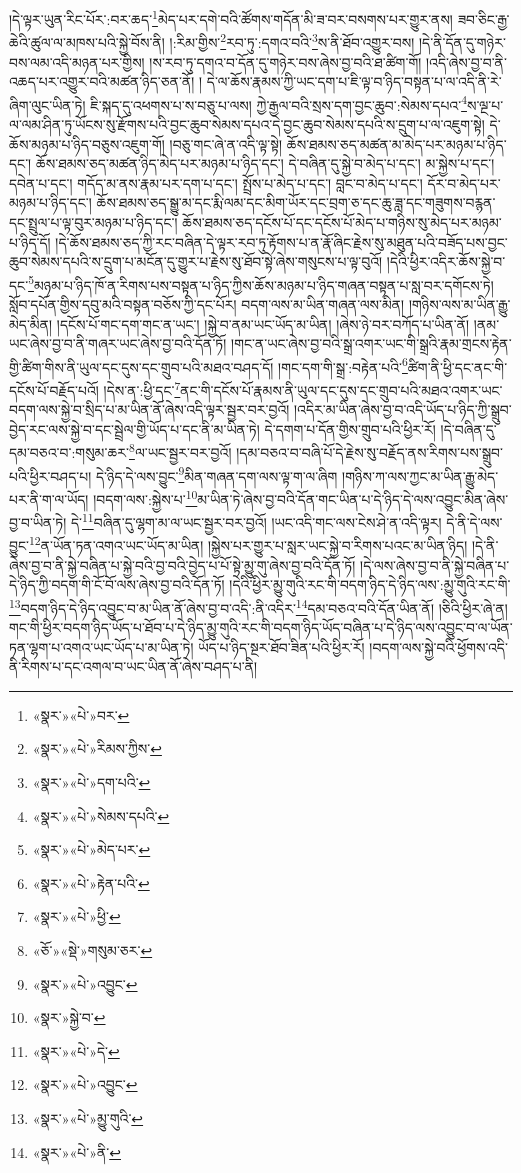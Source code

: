 །དེ་ལྟར་ཡུན་རིང་པོར་:བར་ཆད་\footnote{«སྣར་»«པེ་»བར་}མེད་པར་དགེ་བའི་ཚོགས་གདོན་མི་ཟ་བར་བསགས་པར་གྱུར་ནས། ཟབ་ཅིང་རྒྱ་ཆེའི་ཚུལ་ལ་མཁས་པའི་སྐྱེ་བོས་ནི། །:རིམ་གྱིས་\footnote{«སྣར་»«པེ་»རིམས་ཀྱིས་}རབ་ཏུ་:དགའ་བའི་\footnote{«སྣར་»«པེ་»དག་པའི་}ས་ནི་ཐོབ་འགྱུར་བས། །དེ་ནི་དོན་དུ་གཉེར་བས་ལམ་འདི་མཉན་པར་གྱིས། །ས་རབ་ཏུ་དགའ་བ་དོན་དུ་གཉེར་བས་ཞེས་བྱ་བའི་ཐ་ཚིག་གོ། །འདི་ཞེས་བྱ་བ་ནི་འཆད་པར་འགྱུར་བའི་མཚན་ཉིད་ཅན་ནོ། །
དེ་ལ་ཆོས་རྣམས་ཀྱི་ཡང་དག་པ་ཇི་ལྟ་བ་ཉིད་བསྟན་པ་ལ་འདི་ནི་རེ་ཞིག་ལུང་ཡིན་ཏེ། ཇི་སྐད་དུ་འཕགས་པ་ས་བཅུ་པ་ལས། ཀྱེ་རྒྱལ་བའི་སྲས་དག་བྱང་ཆུབ་:སེམས་དཔའ་\footnote{«སྣར་»«པེ་»སེམས་དཔའི་}ས་ལྔ་པ་ལ་ལམ་ཤིན་ཏུ་ཡོངས་སུ་རྫོགས་པའི་བྱང་ཆུབ་སེམས་དཔའ་དེ་བྱང་ཆུབ་སེམས་དཔའི་ས་དྲུག་པ་ལ་འཇུག་སྟེ། དེ་ཆོས་མཉམ་པ་ཉིད་བཅུས་འཇུག་གོ། །བཅུ་གང་ཞེ་ན་འདི་ལྟ་སྟེ། ཆོས་ཐམས་ཅད་མཚན་མ་མེད་པར་མཉམ་པ་ཉིད་དང་། ཆོས་ཐམས་ཅད་མཚན་ཉིད་མེད་པར་མཉམ་པ་ཉིད་དང་། དེ་བཞིན་དུ་སྐྱེ་བ་མེད་པ་དང་། མ་སྐྱེས་པ་དང་། དབེན་པ་དང་། གདོད་མ་ནས་རྣམ་པར་དག་པ་དང་། སྤྲོས་པ་མེད་པ་དང་། བླང་བ་མེད་པ་དང་། དོར་བ་མེད་པར་མཉམ་པ་ཉིད་དང་། ཆོས་ཐམས་ཅད་སྒྱུ་མ་དང་རྨི་ལམ་དང་མིག་ཡོར་དང་བྲག་ཅ་དང་ཆུ་ཟླ་དང་གཟུགས་བརྙན་དང་སྤྲུལ་པ་ལྟ་བུར་མཉམ་པ་ཉིད་དང་། ཆོས་ཐམས་ཅད་དངོས་པོ་དང་དངོས་པོ་མེད་པ་གཉིས་སུ་མེད་པར་མཉམ་པ་ཉིད་དོ། །དེ་ཆོས་ཐམས་ཅད་ཀྱི་རང་བཞིན་དེ་ལྟར་རབ་ཏུ་རྟོགས་པ་ན་རྣོ་ཞིང་རྗེས་སུ་མཐུན་པའི་བཟོད་པས་བྱང་ཆུབ་སེམས་དཔའི་ས་དྲུག་པ་མངོན་དུ་གྱུར་པ་རྗེས་སུ་ཐོབ་སྟེ་ཞེས་གསུངས་པ་ལྟ་བུའོ། །དེའི་ཕྱིར་འདིར་ཆོས་སྐྱེ་བ་དང་\footnote{«སྣར་»«པེ་»མེད་པར་}མཉམ་པ་ཉིད་ཁོ་ན་རིགས་པས་བསྟན་པ་ཉིད་ཀྱིས་ཆོས་མཉམ་པ་ཉིད་གཞན་བསྟན་པ་སླ་བར་དགོངས་ཏེ། སློབ་དཔོན་གྱིས་དབུ་མའི་བསྟན་བཅོས་ཀྱི་དང་པོར། བདག་ལས་མ་ཡིན་གཞན་ལས་མིན། །གཉིས་ལས་མ་ཡིན་རྒྱུ་མེད་མིན། །དངོས་པོ་གང་དག་གང་ན་ཡང་། །སྐྱེ་བ་ནམ་ཡང་ཡོད་མ་ཡིན། །ཞེས་ཉེ་བར་བཀོད་པ་ཡིན་ནོ། །ནམ་ཡང་ཞེས་བྱ་བ་ནི་གཞར་ཡང་ཞེས་བྱ་བའི་དོན་ཏོ། །གང་ན་ཡང་ཞེས་བྱ་བའི་སྒྲ་འགར་ཡང་གི་སྒྲའི་རྣམ་གྲངས་རྟེན་གྱི་ཚིག་གིས་ནི་ཡུལ་དང་དུས་དང་གྲུབ་པའི་མཐའ་བཤད་དོ། །གང་དག་གི་སྒྲ་:བརྟེན་པའི་\footnote{«སྣར་»«པེ་»རྟེན་པའི་}ཚིག་ནི་ཕྱི་དང་ནང་གི་དངོས་པོ་བརྗོད་པའོ། །དེས་ན་:ཕྱི་དང་\footnote{«སྣར་»«པེ་»ཕྱི་}ནང་གི་དངོས་པོ་རྣམས་ནི་ཡུལ་དང་དུས་དང་གྲུབ་པའི་མཐའ་འགར་ཡང་བདག་ལས་སྐྱེ་བ་སྲིད་པ་མ་ཡིན་ནོ་ཞེས་འདི་ལྟར་སྦྱར་བར་བྱའོ། །འདིར་མ་ཡིན་ཞེས་བྱ་བ་འདི་ཡོད་པ་ཉིད་ཀྱི་སྒྲུབ་བྱེད་རང་ལས་སྐྱེ་བ་དང་སྦྲེལ་གྱི་ཡོད་པ་དང་ནི་མ་ཡིན་ཏེ། དེ་དགག་པ་དོན་གྱིས་གྲུབ་པའི་ཕྱིར་རོ། །དེ་བཞིན་དུ་དམ་བཅའ་བ་:གསུམ་ཆར་\footnote{«ཅོ་»«སྡེ་»གསུམ་ཅར་}ལ་ཡང་སྦྱར་བར་བྱའོ། །དམ་བཅའ་བ་བཞི་པོ་དེ་རྗེས་སུ་བརྗོད་ནས་རིགས་པས་སྒྲུབ་པའི་ཕྱིར་བཤད་པ། དེ་ཉིད་དེ་ལས་བྱུང་\footnote{«སྣར་»«པེ་»འབྱུང་}མིན་གཞན་དག་ལས་ལྟ་ག་ལ་ཞིག །གཉིས་ཀ་ལས་ཀྱང་མ་ཡིན་རྒྱུ་མེད་པར་ནི་ག་ལ་ཡོད། །བདག་ལས་:སྐྱེས་པ་\footnote{«སྣར་»སྐྱེ་བ་}མ་ཡིན་ཏེ་ཞེས་བྱ་བའི་དོན་གང་ཡིན་པ་དེ་ཉིད་དེ་ལས་འབྱུང་མིན་ཞེས་བྱ་བ་ཡིན་ཏེ། དེ་\footnote{«སྣར་»«པེ་»དེ་}བཞིན་དུ་ལྷག་མ་ལ་ཡང་སྦྱར་བར་བྱའོ། །ཡང་འདི་གང་ལས་ངེས་ཤེ་ན་འདི་ལྟར། དེ་ནི་དེ་ལས་བྱུང་\footnote{«སྣར་»«པེ་»འབྱུང་}ན་ཡོན་ཏན་འགའ་ཡང་ཡོད་མ་ཡིན། །སྐྱེས་པར་གྱུར་པ་སླར་ཡང་སྐྱེ་བ་རིགས་པའང་མ་ཡིན་ཉིད། །དེ་ནི་ཞེས་བྱ་བ་ནི་སྐྱེ་བཞིན་པ་སྐྱེ་བའི་བྱ་བའི་བྱེད་པ་པོ་སྟེ་མྱུ་གུ་ཞེས་བྱ་བའི་དོན་ཏོ། །དེ་ལས་ཞེས་བྱ་བ་ནི་སྐྱེ་བཞིན་པ་དེ་ཉིད་ཀྱི་བདག་གི་ངོ་བོ་ལས་ཞེས་བྱ་བའི་དོན་ཏོ། །དེའི་ཕྱིར་མྱུ་གུའི་རང་གི་བདག་ཉིད་དེ་ཉིད་ལས་:མྱུ་གུའི་རང་གི་\footnote{«སྣར་»«པེ་»མྱུ་གུའི་}བདག་ཉིད་དེ་ཉིད་འབྱུང་བ་མ་ཡིན་ནོ་ཞེས་བྱ་བ་འདི་:ནི་འདིར་\footnote{«སྣར་»«པེ་»ནི་}དམ་བཅའ་བའི་དོན་ཡིན་ནོ། །ཅིའི་ཕྱིར་ཞེ་ན། གང་གི་ཕྱིར་བདག་ཉིད་ཡོད་པ་ཐོབ་པ་དེ་ཉིད་མྱུ་གུའི་རང་གི་བདག་ཉིད་ཡོད་བཞིན་པ་དེ་ཉིད་ལས་འབྱུང་བ་ལ་ཡོན་ཏན་ལྷག་པ་འགའ་ཡང་ཡོད་པ་མ་ཡིན་ཏེ། ཡོད་པ་ཉིད་སྔར་ཐོབ་ཟིན་པའི་ཕྱིར་རོ། །བདག་ལས་སྐྱེ་བའི་ཕྱོགས་འདི་ནི་རིགས་པ་དང་འགལ་བ་ཡང་ཡིན་ནོ་ཞེས་བཤད་པ་ནི། 